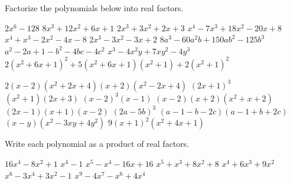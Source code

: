 \begin{Exercise} Factorize the polynomials below into real factors. 
    \begin{multicols}{2}
        \ifanalysis\Question[difficulty = 1]\fi\ifcalculus\Question[difficulty = 2]\fi $2x^6-128$ 
        \Question[difficulty = 1] $8x^3+12x^2+6x+1$ 
        \ifanalysis\Question[difficulty = 1]\fi\ifcalculus\Question[difficulty = 2]\fi $2x^3+3x^2+2x+3$ 
        \Question[difficulty = 1] $x^4-7x^3+18x^2-20x+8$ 
        \Question[difficulty = 1] $x^4+x^3-2x^2-4x-8$
        \Question[difficulty = 1] $2x^3-3x^2-3x+2$
    	\ifanalysis\Question[difficulty = 1]\fi\ifcalculus\Question[difficulty = 2]\fi $8a^3-60a^2b+150ab^2-125b^3$
    	\Question[difficulty = 2] $a^2-2a+1-b^2-4bc-4c^2$
    	\Question[difficulty = 3] $x^3-4x^2y+7xy^2-4y^3$
    	\Question[difficulty = 3] $2(x^2+6x+1)^2+5(x^2+6x+1)(x^2+1)+2(x^2+1)^2$
    	\EndCurrentQuestion
    \end{multicols}

\end{Exercise}

\begin{Answer}\phantom{}
    \begin{multicols}{2}
	
        \Question $2(x-2)\left(x^2+2x+4 \right)(x+2)\left(x^2-2x+4 \right)$ %
        \Question $(2x+1)^3$ %
        \Question $\left(x^2+1\right)\left(2x+3\right)$ %
        \Question $(x-2)^3(x-1)$ %
        \Question $(x-2)(x+2) \left(x^2+x+2 \right)$ %
        \Question $(2x-1)(x+1)(x-2)$ %
        \Question $(2a-5b)^3$ %
        \Question $(a-1-b-2c)(a-1+b+2c)$ %
        \Question $(x-y)(x^2-3xy+4y^2)$ %
        \Question $9(x+1)^2(x^2+4x+1)$ %
	\EndCurrentQuestion
	\end{multicols}
\end{Answer}

\begin{Exercise} Write each polynomial as a product of real factors. 
	 \begin{multicols}{2}
 		\Question[difficulty = 1] $16x^4-8x^2+1$
 		\Question[difficulty = 1] $x^4-1$
 		\Question[difficulty = 1] $x^5-x^4-16x+16$
 		\Question[difficulty = 2] $x^5+x^3+8x^2+8$
 		\Question[difficulty = 1] $x^4+6x^3+9x^2$
 		\ifanalysis\Question[difficulty = 1]\fi\ifcalculus\Question[difficulty = 2]\fi $x^6-3x^4+3x^2-1$
 		\ifanalysis\Question[difficulty = 1]\fi\ifcalculus\Question[difficulty = 2]\fi $x^9-4x^7-x^6+4x^4$
 		\EndCurrentQuestion
    \end{multicols}

\end{Exercise}

